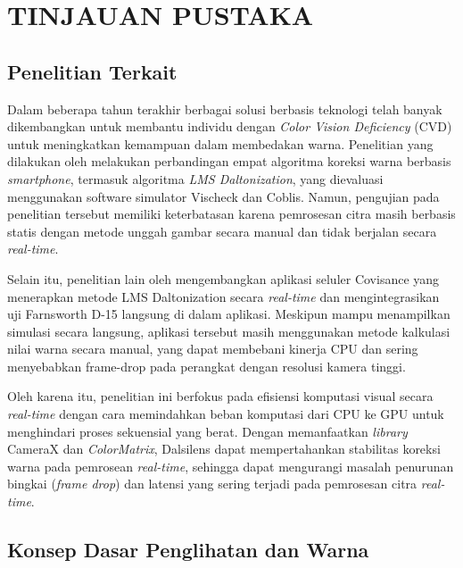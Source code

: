 

\chapter{TINJAUAN PUSTAKA}


\section{Penelitian Terkait}
Dalam beberapa tahun terakhir berbagai solusi berbasis teknologi telah banyak dikembangkan untuk membantu individu dengan \textit{Color Vision Deficiency} (CVD) untuk meningkatkan kemampuan dalam membedakan warna.
Penelitian yang dilakukan oleh \textcite{Elrefaei2018} melakukan perbandingan empat algoritma koreksi warna berbasis \textit{smartphone}, termasuk algoritma \textit{LMS Daltonization}, yang dievaluasi menggunakan software simulator Vischeck dan Coblis.
Namun, pengujian pada penelitian tersebut memiliki keterbatasan karena pemrosesan citra masih berbasis statis dengan metode unggah gambar secara manual dan tidak berjalan secara \textit{real-time}.

Selain itu, penelitian lain oleh \textcite{covisance} mengembangkan aplikasi seluler Covisance yang menerapkan metode LMS Daltonization secara \textit{real-time} dan mengintegrasikan uji Farnsworth D-15 langsung di dalam aplikasi.
Meskipun mampu menampilkan simulasi secara langsung, aplikasi tersebut masih menggunakan metode kalkulasi nilai warna secara manual, yang dapat membebani kinerja CPU dan sering menyebabkan frame-drop pada perangkat dengan resolusi kamera tinggi.

Oleh karena itu, penelitian ini berfokus pada efisiensi komputasi visual secara \textit{real-time} dengan cara memindahkan beban komputasi dari CPU ke GPU untuk menghindari proses sekuensial yang berat.
Dengan memanfaatkan \textit{library} CameraX dan \textit{ColorMatrix}, Dalsilens dapat mempertahankan stabilitas koreksi warna pada pemrosean \textit{real-time}, sehingga dapat mengurangi masalah penurunan bingkai (\textit{frame drop}) dan latensi yang sering terjadi pada pemrosesan citra \textit{real-time}.

\section{Konsep Dasar Penglihatan dan Warna}

